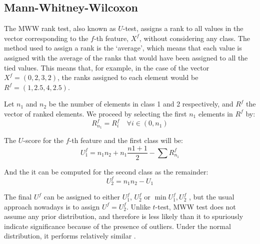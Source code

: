 

\subsection{Mann-Whitney-Wilcoxon} 
The \acf{MWW} rank test, also known as $U$-test, assigns a rank to all values in the vector corresponding to the $f$-th feature, $X^f$, without considering any class. The method used to assign a rank is the `average', which means that each value is assigned with the average of the ranks that would have been assigned to all the tied values. This means that, for example, in the case of the vector $X^f=(0,2,3,2)$, the ranks assigned to each element would be $R^f=(1,2.5,4,2.5)$. 

Let $n_1$ and $n_2$ be the number of elements in class 1 and 2 respectively, and $R^f$ the vector of ranked elements. We proceed by selecting the first $n_1$ elements in $R^f$ by: 
\begin{equation}
	R^f_{n_1} = {R^f_i} \quad \forall i\in(0,n_1)
\end{equation}

The $U$-score for the $f$-th feature and the first class will be: 
\begin{equation}
	U_1^f = n_1 n_2 + n_1 \frac{n1+1}{2} - \sum R^f_{n_1}
\end{equation}

And the it can be computed for the second class as the remainder: 
\begin{equation}
	U_2^f = n_1 n_2 - U_1
\end{equation}

The final $U^f$ can be assigned to either $U_1^f$, $U_2^f$ or $\min{U_1^f,U_2^f}$ \cite{Fay10}, but the usual approach nowadays is to assign $U^f=U_2^f$. Unlike $t$-test, \ac{MWW} test does not assume any prior distribution, and therefore is less likely than it to spuriously indicate significance because of the presence of outliers. Under the normal distribution, it performs relatively similar \cite{Fay10}. 

